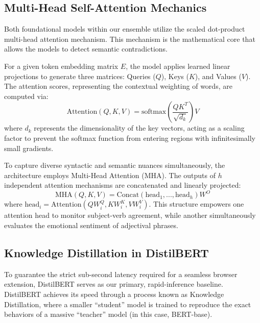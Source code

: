 \documentclass[conference]{IEEEtran}
\begin{document}
\subsection{Multi-Head Self-Attention Mechanics}
Both foundational models within our ensemble utilize the scaled dot-product multi-head attention mechanism. This mechanism is the mathematical core that allows the models to detect semantic contradictions. 

For a given token embedding matrix $E$, the model applies learned linear projections to generate three matrices: Queries ($Q$), Keys ($K$), and Values ($V$). The attention scores, representing the contextual weighting of words, are computed via:
\begin{equation}
\text{Attention}(Q,K,V) = \text{softmax}\left(\frac{QK^T}{\sqrt{d_k}}\right)V
\end{equation}
where $d_k$ represents the dimensionality of the key vectors, acting as a scaling factor to prevent the softmax function from entering regions with infinitesimally small gradients.

To capture diverse syntactic and semantic nuances simultaneously, the architecture employs Multi-Head Attention (MHA). The outputs of $h$ independent attention mechanisms are concatenated and linearly projected:
\begin{equation}
\text{MHA}(Q,K,V) = \text{Concat}(\text{head}_1, ..., \text{head}_h)W^O
\end{equation}
where $\text{head}_i = \text{Attention}(QW_i^Q, KW_i^K, VW_i^V)$. This structure empowers one attention head to monitor subject-verb agreement, while another simultaneously evaluates the emotional sentiment of adjectival phrases.

\subsection{Knowledge Distillation in DistilBERT}
To guarantee the strict sub-second latency required for a seamless browser extension, DistilBERT serves as our primary, rapid-inference baseline. DistilBERT achieves its speed through a process known as Knowledge Distillation, where a smaller ``student'' model is trained to reproduce the exact behaviors of a massive ``teacher'' model (in this case, BERT-base).
\end{document}
